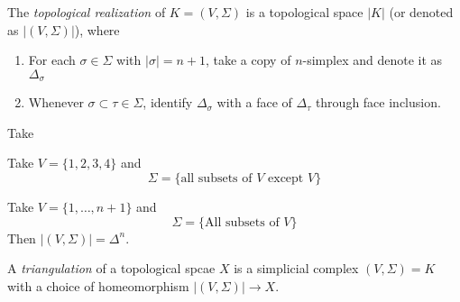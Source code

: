 \begin{definition}
The \emph{topological realization} of $K=(V,\Sigma)$ is 
a topological space $|K|$ (or denoted as $|(V,\Sigma)|$), where
\begin{enumerate}
\item
For each $\sigma\in\Sigma$ with $|\sigma|=n+1$, 
take a copy of $n$-simplex and denote it as $\Delta_\sigma$
\item
Whenever $\sigma\subset\tau\in\Sigma$, identify $\Delta_{\sigma}$ with a face of $\Delta_{\tau}$ through face inclusion.
\end{enumerate}
\end{definition}
\begin{example}
Take 

\end{example}

\begin{example}
Take $V=\{1,2,3,4\}$ and 
\[
\Sigma=\{\text{all subsets of $V$ except $V$}\}
\]
\end{example}
\begin{example}
Take $V=\{1,\dots,n+1\}$ and
\[
\Sigma=\{\text{All subsets of $V$}\}
\]
Then $|(V,\Sigma)| = \Delta^n$.
\end{example}

\begin{definition}[Triangulation]
A \emph{triangulation} of a topological spcae $X$ is a simplicial complex $(V,\Sigma)=K$ with a choice of homeomorphism $|(V,\Sigma)|\to X$.
\end{definition}





















